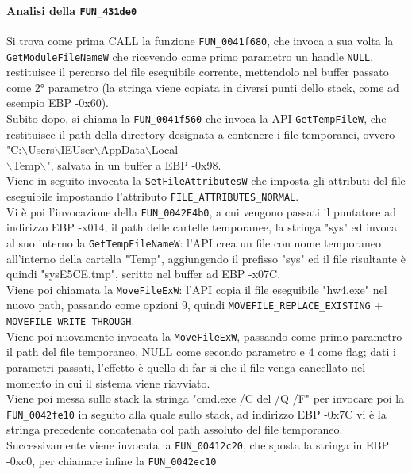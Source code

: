 \documentclass[12pt]{extarticle}
\begin{document}
\paragraph{Analisi della \texttt{FUN\_431de0}} Si trova come prima CALL la funzione \texttt{FUN\_0041f680}, che invoca a sua volta la \texttt{GetModuleFileNameW} che ricevendo come primo parametro un handle \texttt{NULL}, restituisce il percorso del file eseguibile corrente, mettendolo nel buffer passato come 2° parametro (la stringa viene copiata in diversi punti dello stack, come ad esempio EBP -0x60).\\Subito dopo, si chiama la \texttt{FUN\_0041f560} che invoca la API \texttt{GetTempFileW}, che restituisce il path della directory designata a contenere i file temporanei, ovvero \\"C:$\backslash$Users$\backslash$IEUser$\backslash$AppData$\backslash$Local\\$\backslash$Temp$\backslash$", salvata in un buffer a EBP -0x98.\\Viene in seguito invocata la \texttt{SetFileAttributesW} che imposta gli attributi del file eseguibile impostando l'attributo \texttt{FILE\_ATTRIBUTES\_NORMAL}.\\Vi è poi l'invocazione della \texttt{FUN\_0042F4b0}, a cui vengono passati il puntatore ad indirizzo EBP -x014, il path delle cartelle temporanee, la stringa "sys" ed invoca al suo interno la \texttt{GetTempFileNameW}: l'API crea un file con nome temporaneo all'interno della cartella "Temp", aggiungendo il prefisso "sys" ed il file risultante è quindi "sysE5CE.tmp", scritto nel buffer ad EBP -x07C.\\Viene poi chiamata la \texttt{MoveFileExW}: l'API copia il file eseguibile "hw4.exe" nel nuovo path, passando come opzioni 9, quindi \texttt{MOVEFILE\_REPLACE\_EXISTING} + \texttt{MOVEFILE\_WRITE\_THROUGH}.\\Viene poi nuovamente invocata la \texttt{MoveFileExW}, passando come primo parametro il path del file temporaneo, NULL come secondo parametro e 4 come flag; dati i parametri passati, l'effetto è quello di far si che il file venga cancellato nel momento in cui il sistema viene riavviato.\\Viene poi messa sullo stack la stringa "cmd.exe /C del /Q /F" per invocare poi la \texttt{FUN\_0042fe10} in seguito alla quale sullo stack, ad indirizzo EBP -0x7C vi è la stringa precedente concatenata col path assoluto del file temporaneo. Successivamente viene invocata la \texttt{FUN\_00412c20}, che sposta la stringa in EBP -0xc0, per chiamare infine la \texttt{FUN\_0042ec10}
\end{document}

